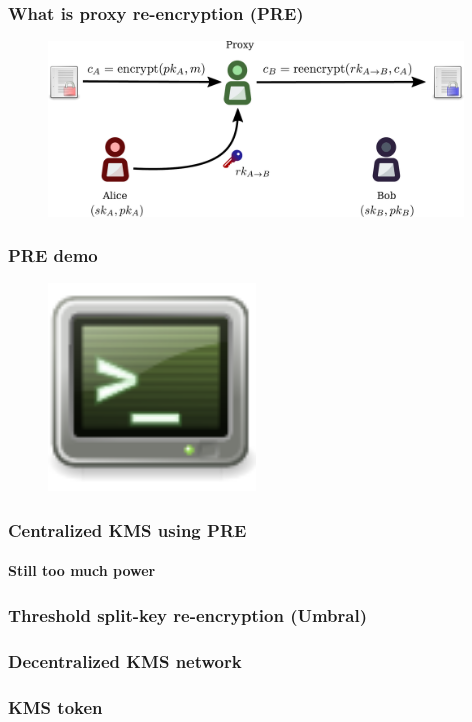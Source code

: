 \documentclass[xetex,mathsans,sans]{beamer}
\begin{document}
    \begin{frame}
        \frametitle{What is proxy re-encryption (PRE)}
        \begin{figure}
            \centering
            \includegraphics[width=11cm]{pdf/pre.pdf}
        \end{figure}
    \end{frame}

    \begin{frame}
        \frametitle{PRE demo}
        \begin{figure}
            \centering
            \includegraphics[height=5.5cm]{pdf/terminal.pdf}
        \end{figure}
    \end{frame}

    \begin{frame}
        \frametitle{Centralized KMS using PRE}
        \framesubtitle{Still too much power}
    \end{frame}

    \begin{frame}
        \frametitle{Threshold split-key re-encryption (Umbral)}
    \end{frame}

    \begin{frame}
        \frametitle{Decentralized KMS network}
    \end{frame}

    \begin{frame}
        \frametitle{KMS token}
    \end{frame}
\end{document}
